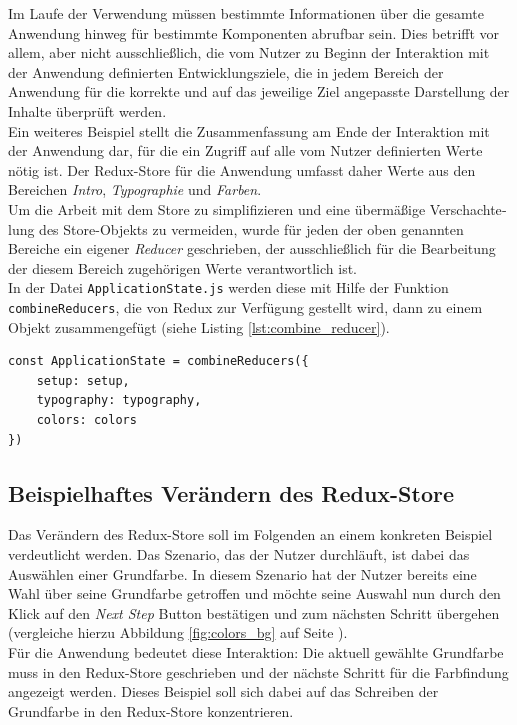 Im Laufe der Verwendung müssen bestimmte Informationen über die gesamte Anwendung hinweg für bestimmte Komponenten abrufbar sein. Dies betrifft vor allem, aber nicht ausschließlich, die vom Nutzer zu Beginn der Interaktion mit der Anwendung definierten Entwicklungsziele, die in jedem Bereich der Anwendung für die korrekte und auf das jeweilige Ziel angepasste Darstellung der  Inhalte überprüft werden.\\
Ein weiteres Beispiel stellt die Zusammenfassung am Ende der Interaktion mit der Anwendung dar, für die ein Zugriff auf alle vom Nutzer definierten Werte nötig ist. Der Redux-Store für die Anwendung umfasst daher Werte aus den Bereichen \textit{Intro}, \textit{Typographie} und \textit{Farben}.\\

Um die Arbeit mit dem Store zu simplifizieren und eine übermäßige Ver­schach­te­lung des Store-Objekts zu vermeiden, wurde für jeden der oben genannten Bereiche ein eigener \textit{Reducer} geschrieben, der ausschließlich für die Bearbeitung der diesem Bereich zugehörigen Werte verantwortlich ist.\\
In der Datei \texttt{ApplicationState.js} werden diese mit Hilfe der Funktion \texttt{combineReducers}, die von Redux zur Verfügung gestellt wird, dann zu einem Objekt zusammengefügt (siehe Listing \ref{lst:combine_reducer}).

\begin{lstlisting}[caption={Zusammenfügen der dedizierten Reducer zu einem Objekt}, label=lst:combine_reducer]
  const ApplicationState = combineReducers({
    setup: setup,
    typography: typography,
    colors: colors
})
\end{lstlisting}

\subsection{Beispielhaftes Verändern des Redux-Store}
Das Verändern des Redux-Store soll im Folgenden an einem konkreten Beispiel verdeutlicht werden. Das Szenario, das der Nutzer durchläuft, ist dabei das Auswählen einer Grundfarbe. In diesem Szenario hat der Nutzer bereits eine Wahl über seine Grundfarbe getroffen und möchte seine Auswahl nun durch den Klick auf den \textit{Next Step} Button bestätigen und zum nächsten Schritt übergehen (vergleiche hierzu Abbildung \ref{fig:colors_bg} auf Seite \pageref{fig:colors_bg}).\\
Für die Anwendung bedeutet diese Interaktion: Die aktuell gewählte Grundfarbe muss in den Redux-Store geschrieben\footnotemark{} und der nächste Schritt für die Farbfindung angezeigt werden. Dieses Beispiel soll sich dabei auf das Schreiben der Grundfarbe in den Redux-Store konzentrieren.\\

